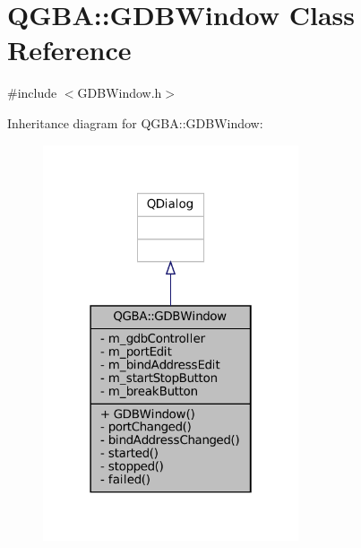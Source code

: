 \hypertarget{class_q_g_b_a_1_1_g_d_b_window}{}\section{Q\+G\+BA\+:\+:G\+D\+B\+Window Class Reference}
\label{class_q_g_b_a_1_1_g_d_b_window}


{\ttfamily \#include $<$G\+D\+B\+Window.\+h$>$}



Inheritance diagram for Q\+G\+BA\+:\+:G\+D\+B\+Window\+:
\nopagebreak
\begin{figure}[H]
\begin{center}
\leavevmode
\includegraphics[width=214pt]{class_q_g_b_a_1_1_g_d_b_window__inherit__graph}
\end{center}
\end{figure}


